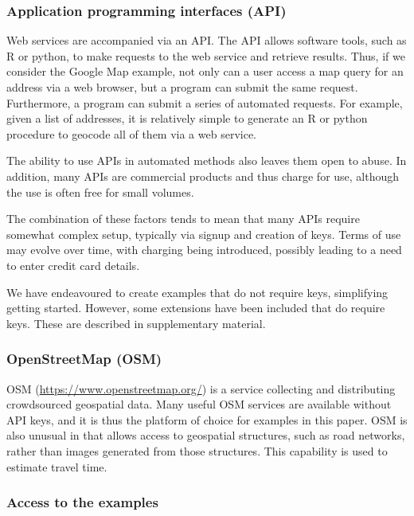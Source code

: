 \documentclass[utf8]{frontiersHLTH}
\begin{document}
\subsubsection{Application programming interfaces
(API)}\label{application-programming-interfaces-api}

Web services are accompanied via an API. The API allows software tools,
such as R or python, to make requests to the web service and retrieve
results. Thus, if we consider the Google Map example, not only can a
user access a map query for an address via a web browser, but a program
can submit the same request. Furthermore, a program can submit a series
of automated requests. For example, given a list of addresses, it is
relatively simple to generate an R or python procedure to geocode all of
them via a web service.

The ability to use APIs in automated methods also leaves them open to
abuse. In addition, many APIs are commercial products and thus charge
for use, although the use is often free for small volumes.

The combination of these factors tends to mean that many APIs require
somewhat complex setup, typically via signup and creation of keys. Terms
of use may evolve over time, with charging being introduced, possibly
leading to a need to enter credit card details.

We have endeavoured to create examples that do not require keys,
simplifying getting started. However, some extensions have been included
that do require keys. These are described in supplementary material.

\subsubsection{OpenStreetMap (OSM)}\label{openstreetmap-osm}

OSM (\url{https://www.openstreetmap.org/}) is a service collecting and
distributing crowdsourced geospatial data. Many useful OSM services are
available without API keys, and it is thus the platform of choice for
examples in this paper. OSM is also unusual in that allows access to
geospatial structures, such as road networks, rather than images
generated from those structures. This capability is used to estimate
travel time.

\subsubsection{Access to the examples}\label{access-to-the-examples}
\end{document}

